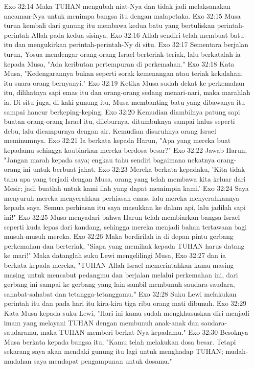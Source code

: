 Exo 32:14  Maka TUHAN mengubah niat-Nya dan tidak jadi melaksanakan ancaman-Nya untuk menimpa bangsa itu dengan malapetaka.
Exo 32:15  Musa turun kembali dari gunung itu membawa kedua batu yang bertuliskan perintah-perintah Allah pada kedua sisinya.
Exo 32:16  Allah sendiri telah membuat batu itu dan mengukirkan perintah-perintah-Ny di situ.
Exo 32:17  Sementara berjalan turun, Yosua mendengar orang-orang Israel berteriak-teriak, lalu berkatalah ia kepada Musa, "Ada keributan pertempuran di perkemahan."
Exo 32:18  Kata Musa, "Kedengarannya bukan seperti sorak kemenangan atau teriak kekalahan; itu suara orang bernyanyi."
Exo 32:19  Ketika Musa sudah dekat ke perkemahan itu, dilihatnya sapi emas itu dan orang-orang sedang menari-nari, maka marahlah ia. Di situ juga, di kaki gunung itu, Musa membanting batu yang dibawanya itu sampai hancur berkeping-keping.
Exo 32:20  Kemudian diambilnya patung sapi buatan orang-orang Israel itu, dileburnya, ditumbuknya sampai halus seperti debu, lalu dicampurnya dengan air. Kemudian disuruhnya orang Israel meminumnya.
Exo 32:21  Ia berkata kepada Harun, "Apa yang mereka buat kepadamu sehingga kaubiarkan mereka berdosa besar?"
Exo 32:22  Jawab Harun, "Jangan marah kepada saya; engkau tahu sendiri bagaimana nekatnya orang-orang ini untuk berbuat jahat.
Exo 32:23  Mereka berkata kepadaku, 'Kita tidak tahu apa yang terjadi dengan Musa, orang yang telah membawa kita keluar dari Mesir; jadi buatlah untuk kami ilah yang dapat memimpin kami.'
Exo 32:24  Saya menyuruh mereka menyerahkan perhiasan emas, lalu mereka menyerahkannya kepada saya. Semua perhiasan itu saya masukkan ke dalam api, lalu jadilah sapi ini!"
Exo 32:25  Musa menyadari bahwa Harun telah membiarkan bangsa Israel seperti kuda lepas dari kandang, sehingga mereka menjadi bahan tertawaan bagi musuh-musuh mereka.
Exo 32:26  Maka berdirilah ia di depan pintu gerbang perkemahan dan berteriak, "Siapa yang memihak kepada TUHAN harus datang ke mari!" Maka datanglah suku Lewi mengelilingi Musa,
Exo 32:27  dan ia berkata kepada mereka, "TUHAN Allah Israel memerintahkan kamu masing-masing untuk mencabut pedangmu dan berjalan melalui perkemahan ini, dari gerbang ini sampai ke gerbang yang lain sambil membunuh saudara-saudara, sahabat-sahabat dan tetangga-tetanggamu."
Exo 32:28  Suku Lewi melakukan perintah itu dan pada hari itu kira-kira tiga ribu orang mati dibunuh.
Exo 32:29  Kata Musa kepada suku Lewi, "Hari ini kamu sudah mengkhususkan diri menjadi imam yang melayani TUHAN dengan membunuh anak-anak dan saudara-saudaramu, maka TUHAN memberi berkat-Nya kepadamu."
Exo 32:30  Besoknya Musa berkata kepada bangsa itu, "Kamu telah melakukan dosa besar. Tetapi sekarang saya akan mendaki gunung itu lagi untuk menghadap TUHAN; mudah-mudahan saya mendapat pengampunan untuk dosamu."
